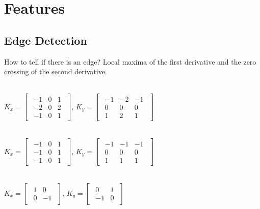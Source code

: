 \section*{Features}
\subsection*{Edge Detection}
How to tell if there is an edge? Local maxima of the first derivative and the zero crossing of the second derivative.\\

\\
$K_x = \begin{bmatrix}
    \begin{smallmatrix}
        -1 & 0 & 1\\
        -2 & 0 & 2\\
        -1 & 0 & 1
    \end{smallmatrix}
\end{bmatrix}$,
$K_y = \begin{bmatrix}
    \begin{smallmatrix}
        -1 & -2 & -1\\
        0 & 0 & 0\\
        1 & 2 & 1
    \end{smallmatrix}
\end{bmatrix}$

\\
$K_x = \begin{bmatrix}
    \begin{smallmatrix}
        -1 & 0 & 1\\
        -1 & 0 & 1\\
        -1 & 0 & 1
    \end{smallmatrix}
\end{bmatrix}$,
$K_y = \begin{bmatrix}
    \begin{smallmatrix}
        -1 & -1 & -1\\
        0 & 0 & 0\\
        1 & 1 & 1
    \end{smallmatrix}
\end{bmatrix}$

\\
$K_x = \begin{bmatrix}
    \begin{smallmatrix}
        1 & 0\\
        0 & -1
    \end{smallmatrix}
\end{bmatrix}$,
$K_y = \begin{bmatrix}
    \begin{smallmatrix}
        0 & 1\\
        -1 & 0
    \end{smallmatrix}
\end{bmatrix}$

